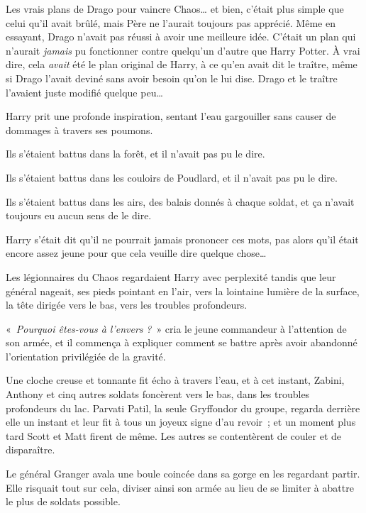 Les vrais plans de Drago pour vaincre Chaos… et bien, c'était plus simple que celui qu'il avait brûlé, mais Père ne l'aurait toujours pas apprécié.
Même en essayant, Drago n'avait pas réussi à avoir une meilleure idée.
C'était un plan qui n'aurait \emph{jamais} pu fonctionner contre quelqu'un d'autre que Harry Potter.
À vrai dire, cela \emph{avait} été le plan original de Harry, à ce qu'en avait dit le traître, même si Drago l'avait deviné sans avoir besoin qu'on le lui dise.
Drago et le traître l'avaient juste modifié quelque peu…

\later

Harry prit une profonde inspiration, sentant l'eau gargouiller sans causer de dommages à travers ses poumons.

Ils s'étaient battus dans la forêt, et il n'avait pas pu le dire.

Ils s'étaient battus dans les couloirs de Poudlard, et il n'avait pas pu le dire.

Ils s'étaient battus dans les airs, des balais donnés à chaque soldat, et ça n'avait toujours eu aucun sens de le dire.

Harry s'était dit qu'il ne pourrait jamais prononcer ces mots, pas alors qu'il était encore assez jeune pour que cela veuille dire quelque chose…

Les légionnaires du Chaos regardaient Harry avec perplexité tandis que leur général nageait, ses pieds pointant en l'air, vers la lointaine lumière de la surface, la tête dirigée vers le bas, vers les troubles profondeurs.

«~\emph{Pourquoi êtes-vous à l'envers} \emph{?}~» cria le jeune commandeur à l'attention de son armée, et il commença à expliquer comment se battre après avoir abandonné l'orientation privilégiée de la gravité.

\later

Une cloche creuse et tonnante fit écho à travers l'eau, et à cet instant, Zabini, Anthony et cinq autres soldats foncèrent vers le bas, dans les troubles profondeurs du lac.
Parvati Patil, la seule Gryffondor du groupe, regarda derrière elle un instant et leur fit à tous un joyeux signe d'au revoir~; et un moment plus tard Scott et Matt firent de même.
Les autres se contentèrent de couler et de disparaître.

Le général Granger avala une boule coincée dans sa gorge en les regardant partir.
Elle risquait tout sur cela, diviser ainsi son armée au lieu de se limiter à abattre le plus de soldats possible.

